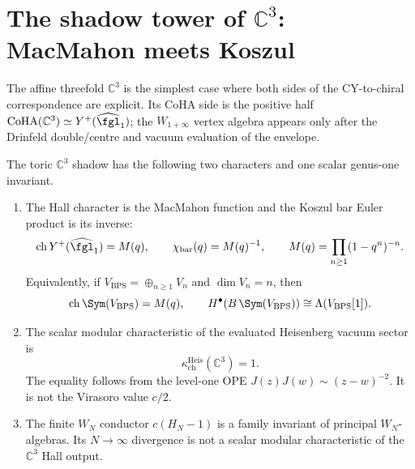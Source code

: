 \section{The shadow tower of \texorpdfstring{$\mathbb{C}^3$}{C-3}: MacMahon meets Koszul}
\label{sec:c3-shadow-tower}

The affine threefold $\mathbb{C}^3$ is the simplest case where both sides of the CY-to-chiral correspondence are explicit.
Its CoHA side is the positive half
$\mathrm{CoHA}(\mathbb{C}^3) \simeq Y^+(\widehat{\fgl}_1)$; the
$W_{1+\infty}$ vertex algebra appears only after the Drinfeld
double/centre and vacuum evaluation of the envelope.

\begin{theorem}
\label{thm:c3-shadow-tower}
The toric \(\mathbb{C}^3\) shadow has the following two characters and
one scalar genus-one invariant.
\begin{enumerate}[label=(\roman*)]
 \item The Hall character is the MacMahon function and the Koszul bar
 Euler product is its inverse:
 \[
 \mathrm{ch}\,Y^+(\widehat{\fgl}_1)=M(q),
 \qquad
 \chi_{\mathrm{bar}}(q)=M(q)^{-1},
 \qquad
 M(q)=\prod_{n\geq 1}(1-q^n)^{-n}.
 \]
Equivalently, if \(V_{\mathrm{BPS}}=\oplus_{n\geq 1}V_n\) and
\(\dim V_n=n\), then
\[
 \mathrm{ch}\,\Sym(V_{\mathrm{BPS}})=M(q),
 \qquad
 H^\bullet(B\,\Sym(V_{\mathrm{BPS}}))\cong \Lambda(V_{\mathrm{BPS}}[1]).
\]
\item The scalar modular characteristic of the evaluated Heisenberg
vacuum sector is
\[
 \kappa_{\mathrm{ch}}^{\mathrm{Heis}}(\mathbb C^3)=1.
 \]
The equality follows from the level-one OPE
\(J(z)J(w)\sim (z-w)^{-2}\). It is not the Virasoro value \(c/2\).
\item The finite \(W_N\) conductor \(c(H_N-1)\) is a family invariant
of principal \(W_N\)-algebras. Its \(N\to\infty\) divergence is not a
scalar modular characteristic of the \(\mathbb C^3\) Hall output.
\end{enumerate}
\end{theorem}

